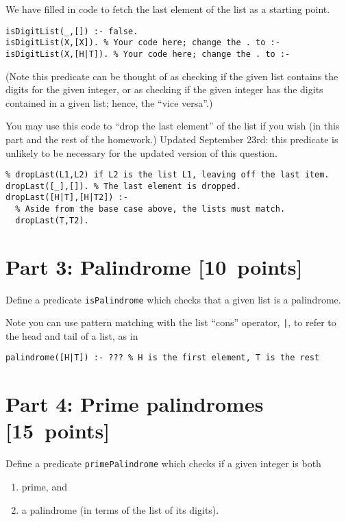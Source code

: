 \documentclass[11pt]{article}
\begin{document}
We have filled in code to fetch the last element of the list
as a starting point.
\begin{verbatim}
isDigitList(_,[]) :- false.
isDigitList(X,[X]). % Your code here; change the . to :-
isDigitList(X,[H|T]). % Your code here; change the . to :-
\end{verbatim}

(Note this predicate can be thought of as checking if the given list contains
the digits for the given integer, or as checking if the given integer
has the digits contained in a given list; hence, the “vice versa”.)

You may use this code to “drop the last element” of the list
if you wish (in this part and the rest of the homework.)
Updated September 23rd: this predicate is unlikely to be necessary
for the updated version of this question.
\begin{verbatim}
% dropLast(L1,L2) if L2 is the list L1, leaving off the last item.
dropLast([_],[]). % The last element is dropped.
dropLast([H|T],[H|T2]) :-
  % Aside from the base case above, the lists must match.
  dropLast(T,T2).
\end{verbatim}

\section*{Part 3: Palindrome                                     [10 points]}
\label{sec:orgfa016db}
Define a predicate \texttt{isPalindrome} which checks that a given
list is a palindrome.

Note you can use pattern matching with the list “cons” operator, \texttt{|},
to refer to the head and tail of a list, as in
\begin{verbatim}
palindrome([H|T]) :- ??? % H is the first element, T is the rest
\end{verbatim}

\section*{Part 4: Prime palindromes                              [15 points]}
\label{sec:org206ab30}
Define a predicate \texttt{primePalindrome} which checks
if a given integer is both
\begin{enumerate}
\item prime, and
\item a palindrome (in terms of the list of its digits).
\end{enumerate}
\end{document}
